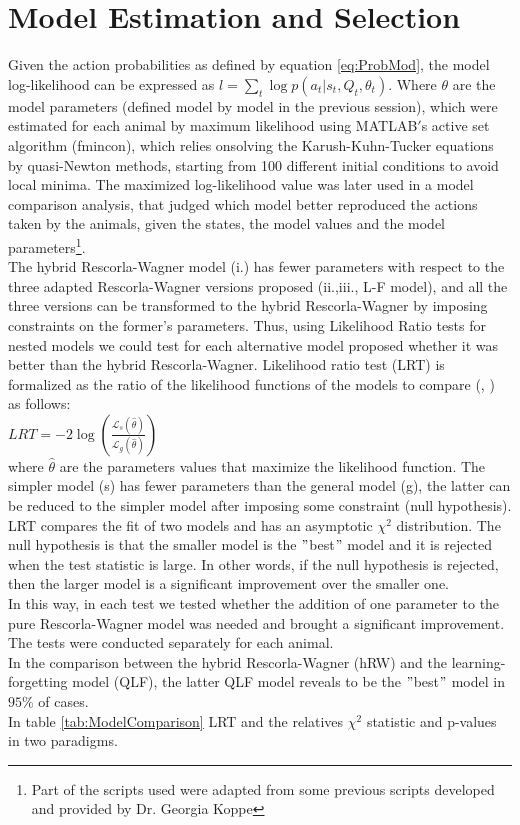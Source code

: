 \section{Model Estimation and Selection}
\label{sec:Behavior}
Given the action probabilities as defined by equation \ref{eq:ProbMod}, the model log-likelihood can be expressed as $l=\sum_{t} \log p(a_t|s_t,Q_t,\theta_t)$. Where $\theta$ are the model parameters (defined model by model in the previous session), which were estimated for each animal by maximum likelihood using MATLAB$'$s active set algorithm (fmincon), which relies onsolving the Karush-Kuhn-Tucker equations by quasi-Newton methods, starting from 100 different initial conditions to avoid local minima. The maximized log-likelihood value was later used in a model comparison analysis, that judged which model better reproduced the actions taken by the animals, given the states, the model values and the model parameters\footnote{Part of the scripts used were adapted from some previous scripts developed and provided by Dr. Georgia Koppe}.\\
The hybrid Rescorla-Wagner model (i.) has fewer parameters with respect to the three adapted Rescorla-Wagner versions proposed (ii.,iii., L-F model), and all the three versions can be transformed to the hybrid Rescorla-Wagner by imposing constraints on the former's parameters. Thus, using Likelihood Ratio tests for nested models we could test for each alternative model proposed whether it was better than the hybrid Rescorla-Wagner. Likelihood ratio test (LRT) is formalized as the ratio of the likelihood functions of the models to compare (\cite{NeymanPearson}, \cite{King}) as follows:\\
 \hspace{5cm} $LRT = -2 \log (\frac{\mathcal{L}_s(\hat{\theta})}{\mathcal{L}_g(\hat{\theta})})$\\
where $\hat{\theta}$ are the parameters values that maximize the likelihood function.
The simpler model (s) has fewer parameters than the general model (g), the latter can be reduced to the simpler model after imposing some constraint (null hypothesis).\\LRT compares the fit of two models and has an asymptotic $\chi^2$ distribution. The null hypothesis is that the smaller model is the $"$best$"$ model and it is rejected when the test statistic is large. In other words, if the null hypothesis is rejected, then the larger model is a significant improvement over the smaller one.\\In this way, in each test we tested whether the addition of one parameter to the pure Rescorla-Wagner model was needed and brought a significant improvement. The tests were conducted separately for each animal.\\In the comparison between the hybrid Rescorla-Wagner (hRW) and the learning-forgetting model (QLF), the latter QLF model reveals to be the $"$best$"$ model in $95\%$ of cases.\\In table \ref{tab:ModelComparison} LRT and the relatives $\chi^2$ statistic and p-values in two paradigms.
